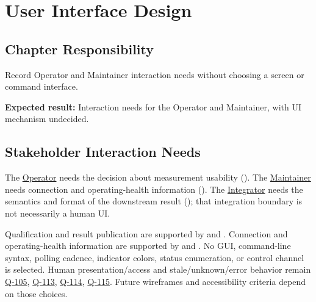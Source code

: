 \chapter{User Interface Design}
\section{Chapter Responsibility}
\label{Section:UserInterfaceDesignResponsibility}
Record Operator and Maintainer interaction needs without choosing a screen or command interface.

\noindent\textbf{Expected result:} Interaction needs for the Operator and Maintainer, with UI mechanism undecided.

\section{Stakeholder Interaction Needs}
The \hyperref[Stakeholder:Operator]{Operator} needs the decision about measurement usability (). The \hyperref[Stakeholder:Maintainer]{Maintainer} needs connection and operating-health information (). The \hyperref[Stakeholder:Integrator]{Integrator} needs the semantics and format of the downstream result (); that integration boundary is not necessarily a human UI.

Qualification and result publication are supported by  and . Connection and operating-health information are supported by  and . No GUI, command-line syntax, polling cadence, indicator colors, status enumeration, or control channel is selected. Human presentation/access and stale/unknown/error behavior remain \hyperref[Question:Q-105]{Q-105}, \hyperref[Question:Q-113]{Q-113}, \hyperref[Question:Q-114]{Q-114}, \hyperref[Question:Q-115]{Q-115}. Future wireframes and accessibility criteria depend on those choices.
